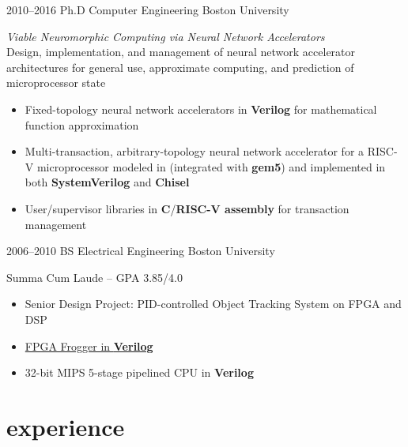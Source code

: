 \documentclass[]{friggeri-cv} %
\begin{document}
\begin{entrylist}


\entry
{2010--2016}
{Ph.D {\normalfont Computer Engineering}}
{Boston University}
{\emph{Viable Neuromorphic Computing via Neural Network Accelerators} \\
  Design, implementation, and management of neural network accelerator architectures for general use, approximate computing, and prediction of microprocessor state
  \begin{itemize}
  \item Fixed-topology neural network accelerators in \textbf{Verilog} for mathematical function approximation
  \item Multi-transaction, arbitrary-topology neural network accelerator for a RISC-V microprocessor modeled in \textbf{\CPP} (integrated with \textbf{gem5}) and implemented in both \textbf{SystemVerilog} and \textbf{Chisel}
  \item User/supervisor libraries in \textbf{C}/\textbf{RISC-V assembly} for transaction management
  \end{itemize}
}


\entry
{2006--2010}
{BS {\normalfont Electrical Engineering}}
{Boston University}
{Summa Cum Laude -- GPA 3.85/4.0
  \begin{itemize}
  \item Senior Design Project: PID-controlled Object Tracking System on FPGA and DSP
  \item \href{https://www.youtube.com/watch?v=S2LgUL5JLqQ}{FPGA Frogger in \textbf{Verilog}}
  \item 32-bit MIPS 5-stage pipelined CPU in \textbf{Verilog}
  \end{itemize}
}


\end{entrylist}


\section{experience}
\end{document}
